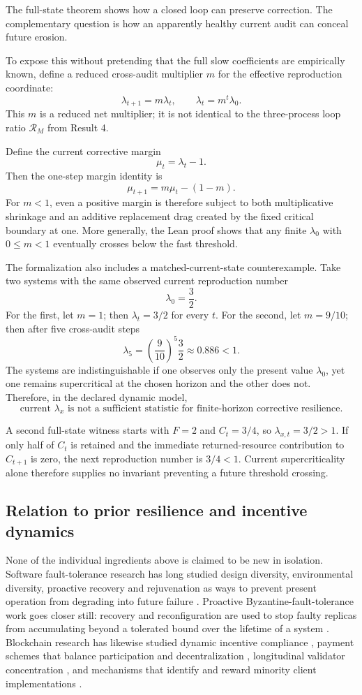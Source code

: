 The full-state theorem shows how a closed loop can preserve correction. The complementary question is how an apparently healthy current audit can conceal future erosion.

To expose this without pretending that the full slow coefficients are empirically known, define a reduced cross-audit multiplier $m$ for the effective reproduction coordinate:
\[
\lambda_{t+1}=m\lambda_t,
\qquad
\lambda_t=m^t\lambda_0.
\]
This $m$ is a reduced net multiplier; it is not identical to the three-process loop ratio $\mathcal R_M$ from Result 4.

Define the current corrective margin
\[
\mu_t=\lambda_t-1.
\]
Then the one-step margin identity is
\[
\boxed{
\mu_{t+1}=m\mu_t-(1-m).
}
\]
For $m<1$, even a positive margin is therefore subject to both multiplicative shrinkage and an additive replacement drag created by the fixed critical boundary at one. More generally, the Lean proof shows that any finite $\lambda_0$ with $0\le m<1$ eventually crosses below the fast threshold.

The formalization also includes a matched-current-state counterexample. Take two systems with the same observed current reproduction number
\[
\lambda_0=\frac32.
\]
For the first, let $m=1$; then $\lambda_t=3/2$ for every $t$. For the second, let $m=9/10$; then after five cross-audit steps
\[
\lambda_5
=\left(\frac9{10}\right)^5\frac32
\approx0.886<1.
\]
The systems are indistinguishable if one observes only the present value $\lambda_0$, yet one remains supercritical at the chosen horizon and the other does not. Therefore, in the declared dynamic model,
\[
\boxed{
\text{current }\lambda_x
\text{ is not a sufficient statistic for finite-horizon corrective resilience.}
}
\]

A second full-state witness starts with $F=2$ and $C_t=3/4$, so $\lambda_{x,t}=3/2>1$. If only half of $C_t$ is retained and the immediate returned-resource contribution to $C_{t+1}$ is zero, the next reproduction number is $3/4<1$. Current supercriticality alone therefore supplies no invariant preventing a future threshold crossing.

\subsection{Relation to prior resilience and incentive dynamics}

None of the individual ingredients above is claimed to be new in isolation. Software fault-tolerance research has long studied design diversity, environmental diversity, proactive recovery and rejuvenation as ways to prevent present operation from degrading into future failure \citep{trivedi2024}. Proactive Byzantine-fault-tolerance work goes closer still: recovery and reconfiguration are used to stop faulty replicas from accumulating beyond a tolerated bound over the lifetime of a system \citep{sousa2007,tran2023}. Blockchain research has likewise studied dynamic incentive compliance \citep{karakostas2023}, payment schemes that balance participation and decentralization \citep{kiayias2024}, longitudinal validator concentration \citep{grandjean2023}, and mechanisms that identify and reward minority client implementations \citep{ron2026}.

